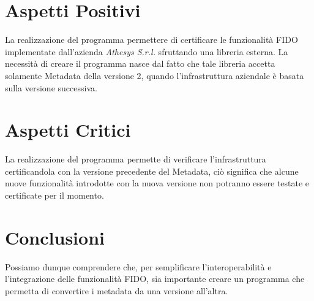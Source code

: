 \section{Aspetti Positivi}
La realizzazione del programma permettere di certificare le funzionalità FIDO implementate dall'azienda \textit{Athesys S.r.l.} sfruttando una libreria esterna. La necessità di creare il programma nasce dal fatto che tale libreria accetta solamente Metadata della versione 2, quando l'infrastruttura aziendale è basata sulla versione successiva.

\section{Aspetti Critici}
La realizzazione del programma permette di verificare l'infrastruttura certificandola con la versione precedente del Metadata, ciò significa che alcune nuove funzionalità introdotte con la nuova versione non potranno essere testate e certificate per il momento.

\section{Conclusioni}
Possiamo dunque comprendere che, per semplificare l'interoperabilità e l'integrazione delle funzionalità FIDO, sia importante creare un programma che permetta di convertire i metadata da una versione all'altra. 